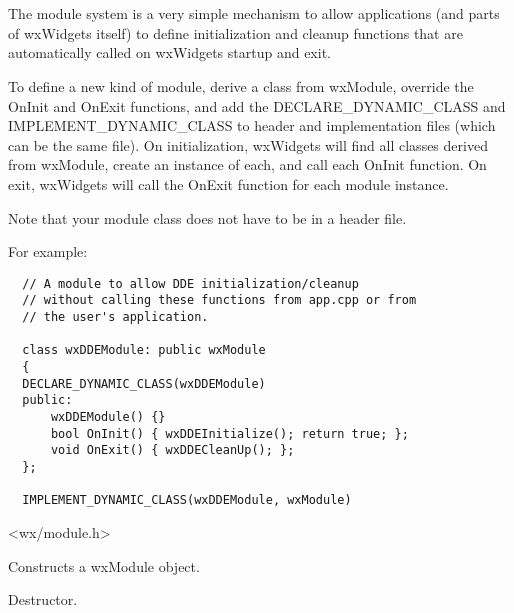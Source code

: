 \section{}\label{wxmodule}

The module system is a very simple mechanism to allow applications (and parts of wxWidgets itself) to
define initialization and cleanup functions that are automatically called on wxWidgets
startup and exit.

To define a new kind of module, derive a class from wxModule, override the OnInit and OnExit functions,
and add the DECLARE\_DYNAMIC\_CLASS and IMPLEMENT\_DYNAMIC\_CLASS to header and implementation files
(which can be the same file). On initialization, wxWidgets will find all classes derived from wxModule,
create an instance of each, and call each OnInit function. On exit, wxWidgets will call the OnExit
function for each module instance.

Note that your module class does not have to be in a header file.

For example:

\begin{verbatim}
  // A module to allow DDE initialization/cleanup
  // without calling these functions from app.cpp or from
  // the user's application.

  class wxDDEModule: public wxModule
  {
  DECLARE_DYNAMIC_CLASS(wxDDEModule)
  public:
      wxDDEModule() {}
      bool OnInit() { wxDDEInitialize(); return true; };
      void OnExit() { wxDDECleanUp(); };
  };

  IMPLEMENT_DYNAMIC_CLASS(wxDDEModule, wxModule)
\end{verbatim}




<wx/module.h>


\label{wxmodulector}


Constructs a wxModule object.

\label{wxmoduledtor}


Destructor.

\label{wxmodulecleanupmodules}

